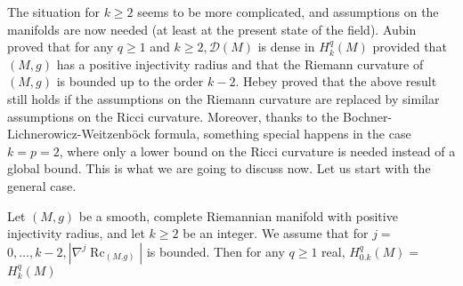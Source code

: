 \documentclass[12pt,hyperref,a4paper,UTF8]{ctexart}
\begin{document}
The situation for $k \geq 2$ seems to be more complicated, and assumptions on the manifolds are now needed (at least at the present state of the field). Aubin \cite{Aubin-} proved that for any $q \geq 1$ and $k \geq 2, \mathcal{D}(M)$ is dense in $H_k^q(M)$ provided that $(M, g)$ has a positive injectivity radius and that the Riemann curvature of $(M, g)$ is bounded up to the order $k-2$. 
Hebey \cite{H2} proved that the above result still holds if the assumptions on the Riemann curvature are replaced by similar assumptions on the Ricci curvature. Moreover, thanks to the Bochner-Lichnerowicz-Weitzenböck formula, something special happens in the case $k=p=2$, where only a lower bound on the Ricci curvature is needed instead of a global bound. This is what we are going to discuss now. Let us start with the general case.

\begin{Proposition}
    Let $(M, g)$ be a smooth, complete Riemannian manifold with positive injectivity radius, and let $k \geq 2$ be an integer. We assume that for $j=$ $0, \ldots, k-2,\left|\nabla^j \operatorname{Rc}_{(M . g)}\right|$ is bounded. Then for any $q \geq 1$ real, $H_{0 . k}^q(M)=$ $H_k^q(M)$
\label{prp42}
\end{Proposition}
\end{document}

